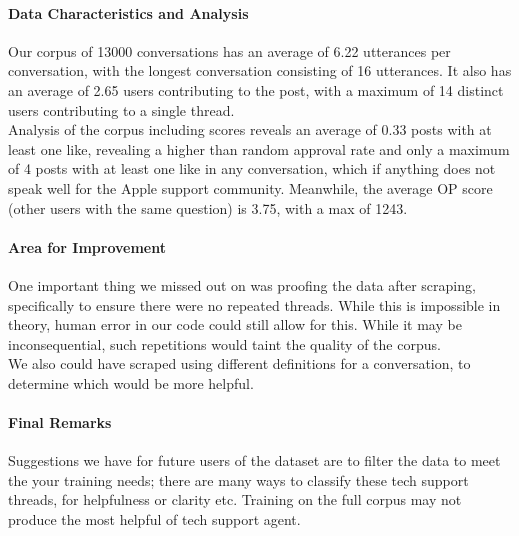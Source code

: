 \documentclass[10pt]{article}
\begin{document}
\begin{multicols}{2}
\paragraph{Data Characteristics and Analysis}
Our corpus of 13000 conversations has an average of 6.22 utterances per conversation, with the longest conversation consisting of 16 utterances. It also has an average of 2.65 users contributing to the post, with a maximum of 14 distinct users contributing to a single thread.\\

Analysis of the corpus including scores reveals an average of 0.33 posts with at least one like, revealing a higher than random approval rate and only a maximum of 4 posts with at least one like in any conversation, which if anything does not speak well for the Apple support community. Meanwhile, the average OP score (other users with the same question) is 3.75, with a max of 1243.

\paragraph{Area for Improvement}
One important thing we missed out on was proofing the data after scraping, specifically to ensure there were no repeated threads. While this is impossible in theory, human error in our code could still allow for this. While it may be inconsequential, such repetitions would taint the quality of the corpus.\\

We also could have scraped using different definitions for a conversation, to determine which would be more helpful.

\paragraph{Final Remarks}
Suggestions we have for future users of the dataset are to filter the data to meet the your training needs; there are many ways to classify these tech support threads, for helpfulness or clarity etc. Training on the full corpus may not produce the most helpful of tech support agent.





\end{multicols}
\end{document}
